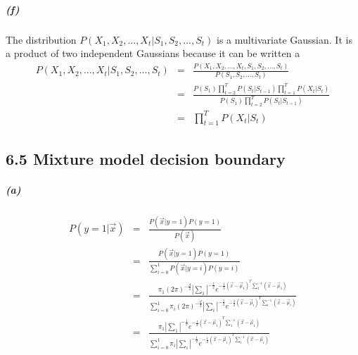 \documentclass{article}
\begin{document}
\subparagraph*{(f)}
The distribution $P(X_1, X_2, ..., X_t | S_1, S_2, ..., S_t)$ is a multivariate Gaussian.
It is a product of two independent Gaussians because it can be written a
\begin{eqnarray*}
	P(X_1, X_2, ..., X_t | S_1, S_2, ..., S_t) &=& \frac{P(X_1, X_2, ..., X_t , S_1, S_2, ..., S_t)}{P( S_1, S_2, ..., S_t)}\\
	&=& \frac{P(S_1)\prod_{t=2}^{T}P(S_t | S_{t-1})\prod_{t=1}^{T}P(X_t | S_t)}{P(S_1)\prod_{t=2}^{T}P(S_t | S_{t-1})}\\
	&=&  \prod_{t=1}^{T}P(X_t | S_t)
\end{eqnarray*}

\subsection*{6.5 Mixture model decision boundary}
\subparagraph*{(a)}
\begin{eqnarray*}
	P(y=1 | \vec{x}) &=& \frac{P (\vec{x} | y=1)P(y=1)}{P(\vec{x})}\\
	&=& \frac{P (\vec{x} | y=1)P(y=1)}{\sum_{i=0}^1 P(\vec{x}|y=i)P(y=i)}\\
	&=& \frac{\pi_1 (2\pi)^{-\frac{d}{2}}|\sum_1|^{-\frac{1}{2}}e^{-\frac{1}{2}(\vec{x}-\vec{\mu}_1)^T\sum_{1}^{-1}(\vec{x}-\vec{\mu}_1)}}{\sum_{i=0}^1 \pi_i (2\pi)^{-\frac{d}{2}}|\sum_i|^{-\frac{1}{2}}e^{-\frac{1}{2}(\vec{x}-\vec{\mu}_i)^T\sum_{i}^{-1}(\vec{x}-\vec{\mu}_i)}}\\
	&=& \frac{\pi_1 |\sum_1|^{-\frac{1}{2}}e^{-\frac{1}{2}(\vec{x}-\vec{\mu}_1)^T\sum_{1}^{-1}(\vec{x}-\vec{\mu}_1)}}{\sum_{i=0}^1 \pi_i |\sum_i|^{-\frac{1}{2}}e^{-\frac{1}{2}(\vec{x}-\vec{\mu}_i)^T\sum_{i}^{-1}(\vec{x}-\vec{\mu}_i)}}\\
\end{eqnarray*}
\end{document}
